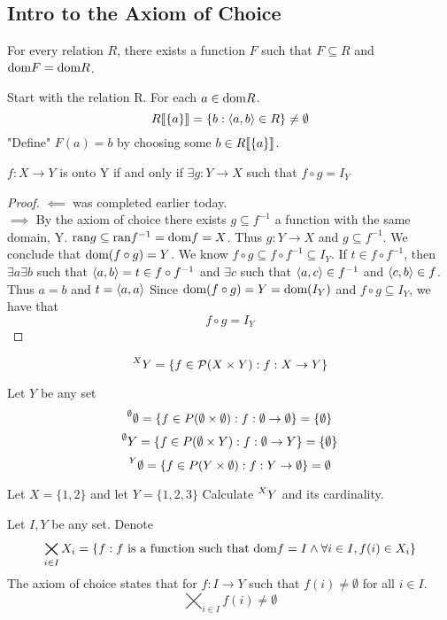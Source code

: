 \subsection{Intro to the Axiom of Choice}
\begin{axiom}
For every relation $R$, there exists a function $F$ such that $F \subseteq R$ and $\dom F = \dom R$.
\end{axiom}
\begin{rem}
Start with the relation R. For each $a \in \dom R$.
\[R \llb \{a\}\rrb = \{b : \la a, b\ra \in R\} \neq \emptyset\]
"Define" $F(a) = b$ by choosing some $b \in R \llb \{a\}\rrb$.
\end{rem}
\begin{thm}
    $f: X \to Y$ is onto Y if and only if $\exists g: Y \to X$ such that $f \circ g = I_Y$
\end{thm}
   \begin{proof}
   $\impliedby$ was completed earlier today.\\
   $\implies$ By the axiom of choice there exists $g \subseteq f^{-1}$ a function with the same domain, Y.
   $\ran g \subseteq \ran f^{-1} = \dom f = X$. Thus $g: Y \to X$ and $g \subseteq f^{-1}$. We conclude that
   $\dom (f \circ g) = Y$. We know $f \circ g \subseteq f \circ f^{-1} \subseteq I_Y$.
   If $t \in f \circ f^{-1}$, then $\exists a \exists b$ such that $\la a, b\ra = t \in f \circ f^{-1}$ and 
   $\exists c$ such that $\la a, c\ra \in f^{-1}$ and $\la c, b\ra \in f$. Thus $a = b$ and $t = \la a, a\ra$
   Since $\dom (f \circ g) = Y = \dom(I_Y)$ and $f \circ g \subseteq I_Y$, we have that 
   \[f \circ g = I_Y\] 
\end{proof}
\begin{defn}
\[\prescript{X}{}{Y} = \{f \in \P(X \times Y): f: X \to Y\} \]
\end{defn}
\begin{ex}
Let $Y$ be any set
\[\prescript{\emptyset}{}{\emptyset} = \{f \in P(\emptyset \times \emptyset): f: \emptyset \to \emptyset\} = \{\emptyset\}\]
\[\prescript{\emptyset}{}{Y} = \{f \in P(\emptyset \times Y): f: \emptyset \to Y\} = \{\emptyset\}\]
\[\prescript{Y}{}{\emptyset} = \{f \in P(Y \times \emptyset): f: Y \to \emptyset\} = \emptyset\]
\end{ex}
\begin{ex}
Let $X = \{1, 2\}$ and let $Y = \{1, 2, 3\}$
Calculate $\prescript{X}{}{Y}$ and its cardinality.
\end{ex}
\begin{axiom}
Let $I, Y$ be any set.
Denote 
\[\bigtimes_{i \in I} X_i = \{f: f \text{ is a function such that } \dom f = I \wedge \forall i\in I, f(i) \in X_i\}\]
The axiom of choice states that for  $f: I \to Y$ such that $f(i) \neq \emptyset$ for all $i \in I$.
\[\bigtimes_{i \in I} f(i) \neq \emptyset\]
\end{axiom}